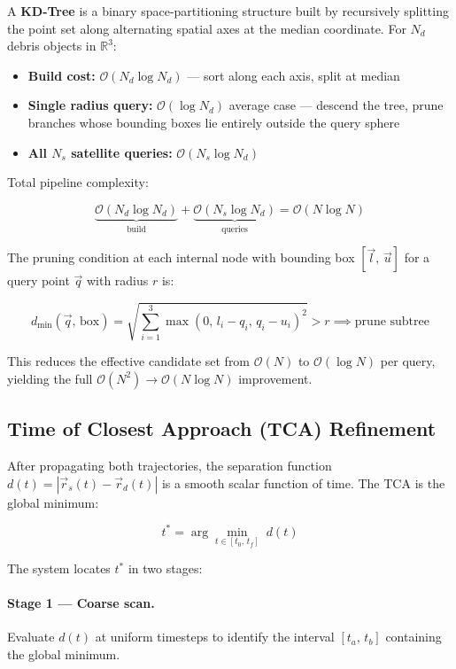 \documentclass[11pt, a4paper]{article}
\begin{document}
A \textbf{KD-Tree} is a binary space-partitioning structure built by recursively splitting the
point set along alternating spatial axes at the median coordinate. For $N_d$ debris objects in
$\mathbb{R}^3$:

\begin{itemize}[leftmargin=1.5cm]
  \item \textbf{Build cost:} $\mathcal{O}(N_d \log N_d)$ --- sort along each axis, split at median
  \item \textbf{Single radius query:} $\mathcal{O}(\log N_d)$ average case --- descend the tree,
        prune branches whose bounding boxes lie entirely outside the query sphere
  \item \textbf{All $N_s$ satellite queries:} $\mathcal{O}(N_s \log N_d)$
\end{itemize}

Total pipeline complexity:

\[
  \underbrace{\mathcal{O}(N_d \log N_d)}_{\text{build}} + \underbrace{\mathcal{O}(N_s \log N_d)}_{\text{queries}}
  = \mathcal{O}(N \log N)
\]

The pruning condition at each internal node with bounding box $[\vec{l},\, \vec{u}]$ for a
query point $\vec{q}$ with radius $r$ is:

\[
  d_{\min}(\vec{q},\,\text{box}) = \sqrt{\sum_{i=1}^{3} \max\!\left(0,\, l_i - q_i,\, q_i - u_i\right)^2}
  > r \implies \text{prune subtree}
\]

This reduces the effective candidate set from $\mathcal{O}(N)$ to $\mathcal{O}(\log N)$ per
query, yielding the full $\mathcal{O}(N^2) \to \mathcal{O}(N \log N)$ improvement.

\subsection{Time of Closest Approach (TCA) Refinement}

After propagating both trajectories, the separation function $d(t) = |\vec{r}_s(t) - \vec{r}_d(t)|$
is a smooth scalar function of time. The TCA is the global minimum:

\[
  t^* = \arg\min_{t \in [t_0,\, t_f]}\; d(t)
\]

The system locates $t^*$ in two stages:

\paragraph{Stage 1 --- Coarse scan.} Evaluate $d(t)$ at uniform timesteps to identify the
interval $[t_a,\, t_b]$ containing the global minimum.
\end{document}
